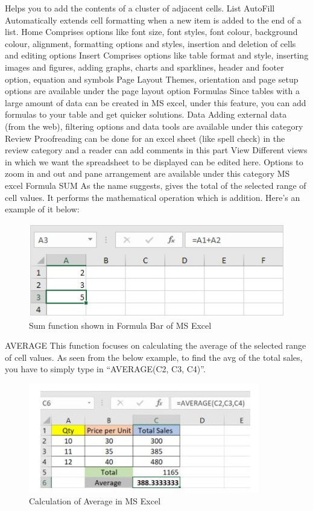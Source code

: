 \documentclass[11pt,a4paper,twoside]{article}
\begin{document}
Helps you to add the contents of a cluster of adjacent cells. 
List AutoFill
Automatically extends cell formatting when a new item is added to the end of a list.
Home
Comprises options like font size, font styles, font colour, background colour, alignment, formatting options and styles, insertion and deletion of cells and editing options
Insert
Comprises options like table format and style, inserting images and figures, adding graphs, charts and sparklines, header and footer option, equation and symbols
Page Layout
Themes, orientation and page setup options are available under the page layout option
Formulas
Since tables with a large amount of data can be created in MS excel, under this feature, you can add formulas to your table and get quicker solutions.
Data
Adding external data (from the web), filtering options and data tools are available under this category
Review
Proofreading can be done for an excel sheet (like spell check) in the review category and a reader can add comments in this part 
View
Different views in which we want the spreadsheet to be displayed can be edited here. Options to zoom in and out and pane arrangement are available under this category
MS excel Formula
SUM
As the name suggests, gives the total of the selected range of cell values. It performs the mathematical operation which is addition. Here’s an example of it below:
\begin{figure}[H]
\includegraphics[width=1\textwidth]{Fig 28.jpg}
\caption{Sum function shown in Formula Bar of MS Excel}
\end{figure}
AVERAGE
This function focuses on calculating the average of the selected range of cell values. As seen from the below example, to find the avg of the total sales, you have to simply type in “AVERAGE(C2, C3, C4)”.
\begin{figure}[H]
\centering \includegraphics[scale=1.2]{Fig 29.jpg}
\caption{Calculation of Average in MS Excel}
\end{figure}
\end{document}
